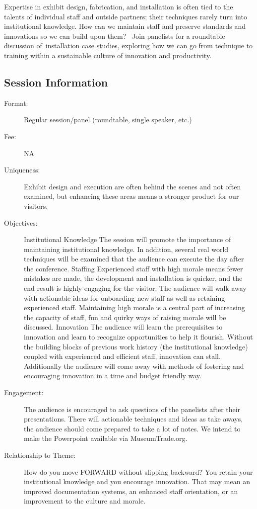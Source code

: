 \documentclass{report}
\begin{document}
              Expertise in exhibit design, fabrication, and installation is often tied to the talents of individual staff and outside partners; their techniques rarely turn into institutional knowledge. How can we maintain staff and preserve standards and innovations so we can build upon them? 
Join panelists for a roundtable discussion of installation case studies, exploring how we can go from technique to training within a sustainable culture of innovation and productivity.

              \subsection*{Session Information}
                \begin{description}
                  \item [Format:] Regular session/panel (roundtable, single speaker, etc.)
							    
								  \item [Fee:]NA
							     
							    \item [Uniqueness:]Exhibit design and execution are often behind the scenes and not often examined, but enhancing these areas means a stronger product for our visitors.
							    \item [Objectives:]Institutional Knowledge
The session will promote the importance of maintaining institutional knowledge. In addition, several real world techniques will be examined that the audience can execute the day after the conference.
Staffing
Experienced staff with high morale means fewer mistakes are made, the development and installation is quicker, and the end result is highly engaging for the visitor. The audience will walk away with actionable ideas for onboarding new staff as well as retaining experienced staff. Maintaining high morale is a central part of increasing the capacity of staff, fun and quirky ways of raising morale will be discussed.
Innovation
The audience will learn the prerequisites to innovation and learn to recognize opportunities to help it flourish. Without the building blocks of previous work history (the institutional knowledge) coupled with experienced and efficient staff, innovation can stall. Additionally the audience will come away with methods of fostering and encouraging innovation in a time and budget friendly way.
							    \item [Engagement:]The audience is encouraged to ask questions of the panelists after their presentations. There will actionable techniques and ideas as take aways, the audience should come prepared to take a lot of notes. We intend to make the Powerpoint available via MuseumTrade.org.
							    \item [Relationship to Theme:]How do you move FORWARD without slipping backward? You retain your institutional knowledge and you encourage innovation. That may mean an improved documentation systems, an enhanced staff orientation, or an improvement to the culture and morale.
							    

\end{description}
\end{document}
